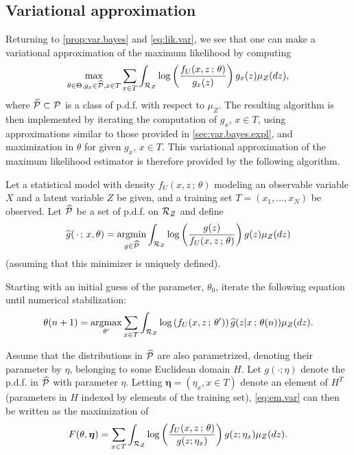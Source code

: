 \subsection{Variational approximation}
\label{sec:var.approx}
Returning to \cref{prop:var.bayes} and \cref{eq:lik.var}, we see that one can make a variational approximation of the maximum likelihood by computing
\begin{equation}
\max_{\theta\in \Theta, g_x \in {\widehat{\mathcal{P}}}, x\in T} \sum_{x\in T} \int_{{\mathcal R}_Z} \log \left(\frac{f_U(x,
z\,;\,\theta)}{g_x(z)}\right) g_x(z) \mu_Z(dz) ,
\label{eq:em.var}
\end{equation}
where ${\widehat{\mathcal{P}}}\subset {\mathcal P}$ is a class of p.d.f. with respect to $\mu_Z$. The resulting algorithm is then implemented by iterating the computation of $g_x$, $x\in T$, using approximations similar to those provided in \cref{sec:var.bayes.expl}, and maximization in $\theta$ for given $g_x$, $x\in T$.  
 This variational approximation of the maximum likelihood estimator is therefore  provided by the following algorithm.
\begin{algorithm}
\label{alg:var.EM}
Let a statistical model with density $f_U(x,z\,;\,\theta)$ modeling an observable variable $X$ and a latent variable $Z$ be given, and a training set $T = (x_1, \ldots, x_N)$ be observed. Let ${\widehat{\mathcal{P}}}$ be a set of p.d.f. on ${\mathcal R}_Z$ and define 
\[
\widehat g(\,\cdot\,;\,x, \theta) = \operatorname*{argmin}_{g\in {\widehat{\mathcal{P}}}} \int_{{\mathcal R}_Z} \log \left(\frac{g(z)}{f_U(x,
z\,;\,\theta)}\right) g(z) \mu_Z(dz)
\]
(assuming that this minimizer is uniquely defined).

Starting with an initial guess of the parameter, $\theta_0$,  iterate the following equation until numerical stabilization:
\begin{equation}
\label{eq:var.EM}
\theta(n+1) = \operatorname*{argmax}_{\theta'} \sum_{x\in T}\int_{{\mathcal R}_Z} \log \left(f_U(x,
z\,;\,\theta')\right) \widehat g(z|x\,;\,\theta(n)) \mu_Z(dz).
\end{equation}
\end{algorithm}

Assume that the distributions in ${\widehat{\mathcal{P}}}$ are also parametrized, denoting their parameter by $\eta$, belonging to some Euclidean domain $H$. Let $g(\cdot; \eta)$ denote the p.d.f. in ${\widehat{\mathcal{P}}}$ with parameter $\eta$. Letting $\boldsymbol \eta  = (\eta_x, x\in T)$ denote an element of $H^T$ (parameters in $H$ indexed by elements of the training set), \cref{eq:em.var} can then be written as the maximization of  
\begin{equation}
F(\theta, {\bm{\eta}}) = \sum_{x\in T} \int_{{\mathcal R}_Z} \log \left(\frac{f_U(x,
z\,;\,\theta)}{g(z;\eta_x)}\right) g(z;\eta_x) \mu_Z(dz) .
\label{eq:em.var.par}
\end{equation}

